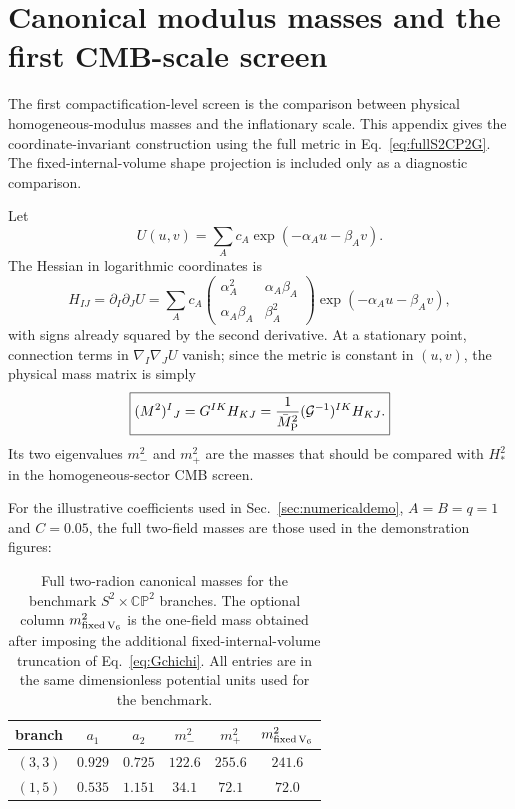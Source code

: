 \documentclass[aps,prd,twocolumn,superscriptaddress,nofootinbib,longbibliography]{revtex4-2}
\newcommand{\Mpl}{\bar M_{\rm P}}
\newcommand{\CP}{\mathbb{CP}}
\begin{document}
\section{Canonical modulus masses and the first CMB-scale screen}
\label{app:canonicalmassscreen}
The first compactification-level screen is the comparison between physical homogeneous-modulus masses and the inflationary scale. This appendix gives the coordinate-invariant construction using the full metric in Eq.~\eqref{eq:fullS2CP2G}. The fixed-internal-volume shape projection is included only as a diagnostic comparison.

Let
\begin{equation}
U(u,v)=\sum_A c_A\exp(-\alpha_A u-\beta_A v).
\end{equation}
The Hessian in logarithmic coordinates is
\begin{equation}
H_{IJ}=\partial_I\partial_JU
=\sum_A c_A
\begin{pmatrix}
\alpha_A^2&\alpha_A\beta_A\\
\alpha_A\beta_A&\beta_A^2
\end{pmatrix}
\exp(-\alpha_Au-\beta_Av),
\label{eq:fullHessianExp}
\end{equation}
with signs already squared by the second derivative. At a stationary point, connection terms in $\nabla_I\nabla_JU$ vanish; since the metric is constant in $(u,v)$, the physical mass matrix is simply
\begin{equation}
\boxed{
(M^2)^I{}_{J}=G^{IK}H_{KJ}
=\frac{1}{\Mpl^2}(\mathcal G^{-1})^{IK}H_{KJ}.
}
\label{eq:fullCanonicalMass}
\end{equation}
Its two eigenvalues $m_-^2$ and $m_+^2$ are the masses that should be compared with $H_*^2$ in the homogeneous-sector CMB screen.

For the illustrative coefficients used in Sec.~\ref{sec:numericaldemo}, $A=B=q=1$ and $C=0.05$, the full two-field masses are those used in the demonstration figures:
\begin{table}[h]
\caption{Full two-radion canonical masses for the benchmark $S^2\times\CP^2$ branches. The optional column $m_{\rm fixed\,V_6}^2$ is the one-field mass obtained after imposing the additional fixed-internal-volume truncation of Eq.~\eqref{eq:Gchichi}. All entries are in the same dimensionless potential units used for the benchmark.}
\label{tab:canonicalmasses}
\begin{ruledtabular}
\begin{tabular}{c c c c c c}
branch & $a_1$ & $a_2$ & $m_-^2$ & $m_+^2$ & $m_{\rm fixed\,V_6}^2$\\
\hline
$(3,3)$ & $0.929$ & $0.725$ & $122.6$ & $255.6$ & $241.6$\\
$(1,5)$ & $0.535$ & $1.151$ & $34.1$ & $72.1$ & $72.0$
\end{tabular}
\end{ruledtabular}
\end{table}
\end{document}
